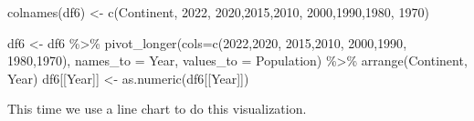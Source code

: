 \documentclass[
]{article}
\newenvironment{Shaded}{\begin{snugshade}}{\end{snugshade}}
\newcommand{\AttributeTok}[1]{\textcolor[rgb]{0.77,0.63,0.00}{#1}}
\newcommand{\FunctionTok}[1]{\textcolor[rgb]{0.00,0.00,0.00}{#1}}
\newcommand{\NormalTok}[1]{#1}
\newcommand{\OtherTok}[1]{\textcolor[rgb]{0.56,0.35,0.01}{#1}}
\newcommand{\SpecialCharTok}[1]{\textcolor[rgb]{0.00,0.00,0.00}{#1}}
\newcommand{\StringTok}[1]{\textcolor[rgb]{0.31,0.60,0.02}{#1}}
\begin{document}
\begin{Shaded}
\begin{Highlighting}[]
\FunctionTok{colnames}\NormalTok{(df6) }\OtherTok{\textless{}{-}} \FunctionTok{c}\NormalTok{(}\StringTok{\textquotesingle{}Continent\textquotesingle{}}\NormalTok{, }\StringTok{\textquotesingle{}2022\textquotesingle{}}\NormalTok{,}
                  \StringTok{\textquotesingle{}2020\textquotesingle{}}\NormalTok{,}\StringTok{\textquotesingle{}2015\textquotesingle{}}\NormalTok{,}\StringTok{\textquotesingle{}2010\textquotesingle{}}\NormalTok{,}
                  \StringTok{\textquotesingle{}2000\textquotesingle{}}\NormalTok{,}\StringTok{\textquotesingle{}1990\textquotesingle{}}\NormalTok{,}\StringTok{\textquotesingle{}1980\textquotesingle{}}\NormalTok{,}
                  \StringTok{\textquotesingle{}1970\textquotesingle{}}\NormalTok{)}

\NormalTok{df6 }\OtherTok{\textless{}{-}}\NormalTok{ df6 }\SpecialCharTok{\%\textgreater{}\%} \FunctionTok{pivot\_longer}\NormalTok{(}\AttributeTok{cols=}\FunctionTok{c}\NormalTok{(}\StringTok{\textquotesingle{}2022\textquotesingle{}}\NormalTok{,}\StringTok{\textquotesingle{}2020\textquotesingle{}}\NormalTok{,}
                       \StringTok{\textquotesingle{}2015\textquotesingle{}}\NormalTok{,}\StringTok{\textquotesingle{}2010\textquotesingle{}}\NormalTok{,}
                      \StringTok{\textquotesingle{}2000\textquotesingle{}}\NormalTok{,}\StringTok{\textquotesingle{}1990\textquotesingle{}}\NormalTok{,}
                      \StringTok{\textquotesingle{}1980\textquotesingle{}}\NormalTok{,}\StringTok{\textquotesingle{}1970\textquotesingle{}}\NormalTok{),}
                      \AttributeTok{names\_to =} \StringTok{\textquotesingle{}Year\textquotesingle{}}\NormalTok{, }\AttributeTok{values\_to =} \StringTok{\textquotesingle{}Population\textquotesingle{}}\NormalTok{) }\SpecialCharTok{\%\textgreater{}\%}
  \FunctionTok{arrange}\NormalTok{(Continent, Year)}
\NormalTok{df6[[}\StringTok{\textquotesingle{}Year\textquotesingle{}}\NormalTok{]] }\OtherTok{\textless{}{-}} \FunctionTok{as.numeric}\NormalTok{(df6[[}\StringTok{\textquotesingle{}Year\textquotesingle{}}\NormalTok{]])}
\end{Highlighting}
\end{Shaded}

This time we use a line chart to do this visualization.
\end{document}
